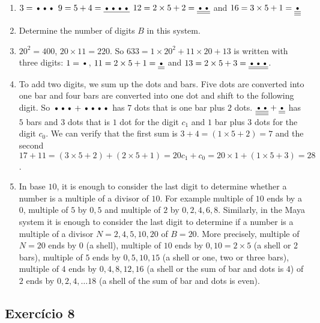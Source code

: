 \begin{enumerate}
\item $3=\text{\textbullet\textbullet\textbullet}$
  $9=5+4=\underline{\text{\textbullet\textbullet\textbullet\textbullet}}$
  $12=2\times5+2=
  \underline{\underline{\text{\textbullet\textbullet}}}$
  and $16=3\times5+1=
  \underline{\underline{\underline{\text{\textbullet}}}}$
\item Determine the number of digits $B$ in this system.
\item $20^2=400$, $20\times11=220$. So
  $633=1\times20^2+11\times20+13$ is written with three digits:
  $1=\text{\textbullet}$,
  $11=2\times5+1=\underline{\underline{\text{\textbullet}}}$ and
  $13=2\times5+3=\underline{\underline{\text{\textbullet\textbullet\textbullet}}}$.
\item To add two digits, we sum up the dots and bars.
  Five dots are converted into one bar and four bars are converted into
  one dot and shift to the following digit.
  So $\text{\textbullet\textbullet\textbullet} +
  \text{\textbullet\textbullet\textbullet\textbullet}$
  has $7$ dots that is one bar plus $2$ dots.
  ${\underline{\underline{\underline{\text{\textbullet\textbullet}}}}} +
  {\underline{\underline{\text{\textbullet}}}}$
  has $5$ bars and $3$ dots that is $1$ dot for the digit $c_1$ and
  $1$ bar plus $3$ dots for the digit $c_0$.
  We can verify that the first sum is $3+4={(1\times5+2)}=7$ and
  the second $17+11={(3\times5+2)} + {(2\times5+1)} =
  {20c_1+c_0}=
  {20\times1 + {(1\times5+3)}} = 28$.

\item
  In base $10$, it is enough to consider
  the last digit to determine whether a number is a multiple of a divisor
  of $10$. For example multiple of $10$ ends by a $0$, multiple of $5$ by
  $0,5$ and multiple of $2$ by $0,2,4,6,8$.
  Similarly, in the Maya system it is enough to consider the last digit to
  determine if a number is a multiple of a divisor $N=2,4,5,10,20$ of $B=20$.
  More precisely, multiple of $N=20$ ends by $0$ (a shell), multiple of $10$
  ends by $0,10=2\times5$ (a shell or 2 bars), multiple of
  $5$ ends by $0,5,10,15$ (a shell or one, two or three bars), multiple
  of $4$ ends by $0,4,8,12,16$ (a shell or the sum of bar and dots is $4$)
  of $2$ ends by $0,2,4,\ldots18$ (a shell of the sum of bar and dots is even).

\end{enumerate}

\subsection*{Exercício 8}

